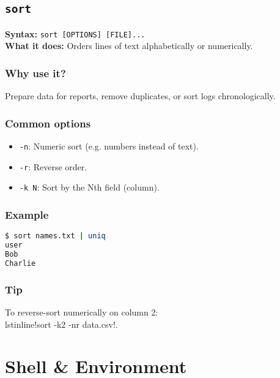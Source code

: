 \documentclass[10pt,oneside]{scrbook}
\begin{document}
\section{\texttt{sort}}
\begin{cmdbox}
  \textbf{Syntax:} \lstinline!sort [OPTIONS] [FILE]...! \\
  \textbf{What it does:} Orders lines of text alphabetically or numerically.
\end{cmdbox}
\begin{commanddetails}
  \subsection*{Why use it?}
    Prepare data for reports, remove duplicates, or sort logs chronologically.

  \subsection*{Common options}
  \begin{itemize}
    \item \lstinline!-n!: Numeric sort (e.g. numbers instead of text).
    \item \lstinline!-r!: Reverse order.
    \item \lstinline!-k N!: Sort by the Nth field (column).
  \end{itemize}

  \subsection*{Example}
  \begin{lstlisting}[language=bash]
$ sort names.txt | uniq
user
Bob
Charlie
  \end{lstlisting}

  \subsection*{Tip}
    To reverse-sort numerically on column 2: \\lstinline!sort -k2 -nr data.csv!.
\end{commanddetails}

\chapter{Shell \& Environment}
\end{document}
